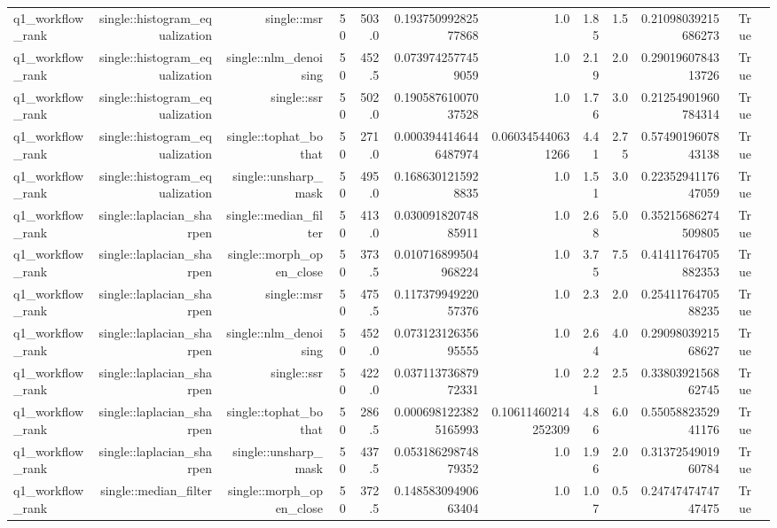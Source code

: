 \begin{tabular}{lrrrrrrrrrrr}
q1\_workflow\_rank & single::histogram\_equalization & single::msr & 50 & 503.0 & 0.19375099282577868 & 1.0 & 1.85 & 1.5 & 0.21098039215686273 & True &  \\
q1\_workflow\_rank & single::histogram\_equalization & single::nlm\_denoising & 50 & 452.5 & 0.0739742577459059 & 1.0 & 2.19 & 2.0 & 0.2901960784313726 & True &  \\
q1\_workflow\_rank & single::histogram\_equalization & single::ssr & 50 & 502.0 & 0.19058761007037528 & 1.0 & 1.76 & 3.0 & 0.21254901960784314 & True &  \\
q1\_workflow\_rank & single::histogram\_equalization & single::tophat\_bothat & 50 & 271.0 & 0.0003944146446487974 & 0.060345440631266 & 4.41 & 2.75 & 0.5749019607843138 & True &  \\
q1\_workflow\_rank & single::histogram\_equalization & single::unsharp\_mask & 50 & 495.0 & 0.1686301215928835 & 1.0 & 1.51 & 3.0 & 0.2235294117647059 & True &  \\
q1\_workflow\_rank & single::laplacian\_sharpen & single::median\_filter & 50 & 413.0 & 0.03009182074885911 & 1.0 & 2.68 & 5.0 & 0.35215686274509805 & True &  \\
q1\_workflow\_rank & single::laplacian\_sharpen & single::morph\_open\_close & 50 & 373.5 & 0.010716899504968224 & 1.0 & 3.75 & 7.5 & 0.41411764705882353 & True &  \\
q1\_workflow\_rank & single::laplacian\_sharpen & single::msr & 50 & 475.5 & 0.11737994922057376 & 1.0 & 2.3 & 2.0 & 0.2541176470588235 & True &  \\
q1\_workflow\_rank & single::laplacian\_sharpen & single::nlm\_denoising & 50 & 452.0 & 0.07312312635695555 & 1.0 & 2.64 & 4.0 & 0.2909803921568627 & True &  \\
q1\_workflow\_rank & single::laplacian\_sharpen & single::ssr & 50 & 422.0 & 0.03711373687972331 & 1.0 & 2.21 & 2.5 & 0.3380392156862745 & True &  \\
q1\_workflow\_rank & single::laplacian\_sharpen & single::tophat\_bothat & 50 & 286.5 & 0.0006981223825165993 & 0.10611460214252309 & 4.86 & 6.0 & 0.5505882352941176 & True &  \\
q1\_workflow\_rank & single::laplacian\_sharpen & single::unsharp\_mask & 50 & 437.5 & 0.05318629874879352 & 1.0 & 1.96 & 2.0 & 0.3137254901960784 & True &  \\
q1\_workflow\_rank & single::median\_filter & single::morph\_open\_close & 50 & 372.5 & 0.14858309490663404 & 1.0 & 1.07 & 0.5 & 0.2474747474747475 & True &  \\

\end{tabular}
